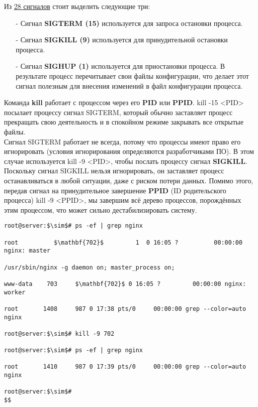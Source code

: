 \documentclass[14pt, a4paper]{article}
\begin{document}
\noindent Из \href{https://ru.wikipedia.org/wiki/Сигнал_(Unix)}{28 сигналов} стоит выделить следующие три:
\begin{itemize}
    \item[-] Сигнал \textbf{SIGTERM (15)} используется для запроса остановки процесса.
    \item[-] Сигнал \textbf{SIGKILL (9)} используется для принудительной остановки процесса.
    \item[-] Сигнал \textbf{SIGHUP (1)} используется для приостановки процесса. В результате процесс
    перечитывает свои файлы конфигурации, что делает этот сигнал полезным для внесения
    изменений в файл конфигурации процесса.
\end{itemize}

Команда \textbf{kill} работает с процессом через его \textbf{PID} или \textbf{PPID}. \colorbox{backcolour}{kill -15} 
\colorbox{backcolour}{<PID>} посылает процессу сигнал SIGTERM, который обычно заставляет процесс прекращать свою деятельность и в спокойном
режиме закрывать все открытые файлы.\\

Сигнал SIGTERM работает не всегда, потому что процессы имеют право его игнорировать (условия
игнорирования определяются разработчиками ПО). В этом случае используется \colorbox{backcolour}{kill -9 <PID>},
чтобы послать процессу сигнал \textbf{SIGKILL}. Поскольку сигнал SIGKILL нельзя игнорировать, он
заставляет процесс останавливаться в любой ситуации, даже с риском потери данных. Помимо этого,
передав сигнал на принудительное завершение \textbf{PPID} (ID родительского процесса) \colorbox{backcolour}{kill -9 <PPID>},
мы завершим всё дерево процессов, порождённых этим процессом, что может сильно
дестабилизировать систему.

\vspace{0.3cm}

\begin{lstlisting}
root@server:$\sim$# ps -ef | grep nginx

root          $\mathbf{702}$         1  0 16:05 ?          00:00:00 nginx: master

/usr/sbin/nginx -g daemon on; master_process on;

www-data    703     $\mathbf{702}$ 0 16:05 ?         00:00:00 nginx: worker

root       1408     987 0 17:38 pts/0     00:00:00 grep --color=auto nginx

root@server:$\sim$# kill -9 702

root@server:$\sim$# ps -ef | grep nginx

root       1410     987 0 17:39 pts/0     00:00:00 grep --color=auto nginx

root@server:$\sim$#
$$
\end{lstlisting}
\vspace{0.2cm}
\end{document}
